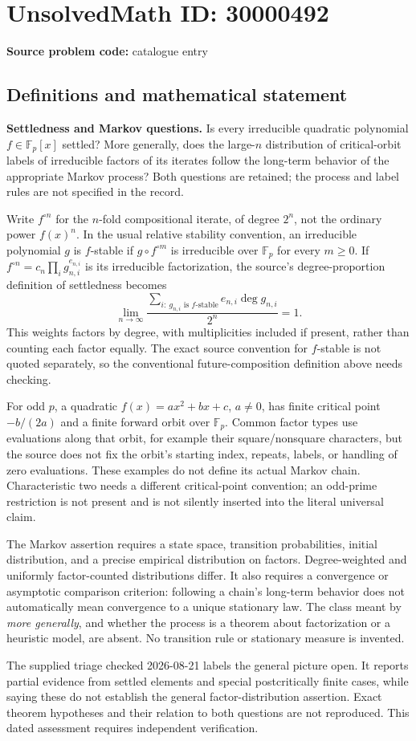 \documentclass[11pt]{article}
\newcommand{\F}{\mathbb{F}}
\begin{document}
\section*{UnsolvedMath ID: 30000492}
\textbf{Source problem code:} catalogue entry
\subsection{Definitions and mathematical statement}
\textbf{Settledness and Markov questions.} Is every irreducible quadratic polynomial \(f\in\F_p[x]\) settled? More generally, does the large-\(n\) distribution of critical-orbit labels of irreducible factors of its iterates follow the long-term behavior of the appropriate Markov process? Both questions are retained; the process and label rules are not specified in the record.\par Write \(f^{\circ n}\) for the \(n\)-fold compositional iterate, of degree \(2^n\), not the ordinary power \(f(x)^n\). In the usual relative stability convention, an irreducible polynomial \(g\) is \(f\)-stable if \(g\circ f^{\circ m}\) is irreducible over \(\F_p\) for every \(m\ge0\). If \(f^{\circ n}=c_n\prod_i g_{n,i}^{e_{n,i}}\) is its irreducible factorization, the source's degree-proportion definition of settledness becomes\[\lim_{n\to\infty}\frac{\sum_{i:\ g_{n,i}\text{ is }f\text{-stable}}e_{n,i}\deg g_{n,i}}{2^n}=1.\] This weights factors by degree, with multiplicities included if present, rather than counting each factor equally. The exact source convention for \(f\)-stable is not quoted separately, so the conventional future-composition definition above needs checking.\par For odd \(p\), a quadratic \(f(x)=ax^2+bx+c\), \(a\ne0\), has finite critical point \(-b/(2a)\) and a finite forward orbit over \(\F_p\). Common factor types use evaluations along that orbit, for example their square/nonsquare characters, but the source does not fix the orbit's starting index, repeats, labels, or handling of zero evaluations. These examples do not define its actual Markov chain. Characteristic two needs a different critical-point convention; an odd-prime restriction is not present and is not silently inserted into the literal universal claim.\par The Markov assertion requires a state space, transition probabilities, initial distribution, and a precise empirical distribution on factors. Degree-weighted and uniformly factor-counted distributions differ. It also requires a convergence or asymptotic comparison criterion: following a chain's long-term behavior does not automatically mean convergence to a unique stationary law. The class meant by \emph{more generally}, and whether the process is a theorem about factorization or a heuristic model, are absent. No transition rule or stationary measure is invented.\par The supplied triage checked 2026-08-21 labels the general picture open. It reports partial evidence from settled elements and special postcritically finite cases, while saying these do not establish the general factor-distribution assertion. Exact theorem hypotheses and their relation to both questions are not reproduced. This dated assessment requires independent verification.
\end{document}
